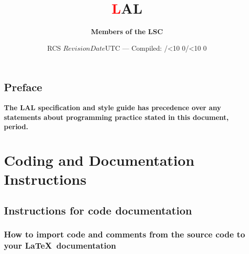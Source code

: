 \documentclass[oneside]{book}
\def\rcs#1{\def\next##1#1{\mbox{##1}}\next}
\begin{document}

\title{\sffamily\bfseries\Huge
\textcolor{red}{\lsdfont L}AL
\hspace{-2em}
}
\author{\bf Members of the LSC}
\date{RCS \rcs$Revision$\rcs$Date$UTC --- Compiled:
\number\year/\ifnum\month<10 0\fi\number\month/\ifnum\day<10 0\fi\number\day}
\maketitle



\tableofcontents

\chapter*{Preface}
\textbf{The LAL specification and style guide has precedence over any
statements about programming practice stated in this document, period.}

\part{Coding and Documentation Instructions}

\chapter{Instructions for code documentation}
\section{How to import code and comments from the source code to 
your \LaTeX\ documentation}
\end{document}
